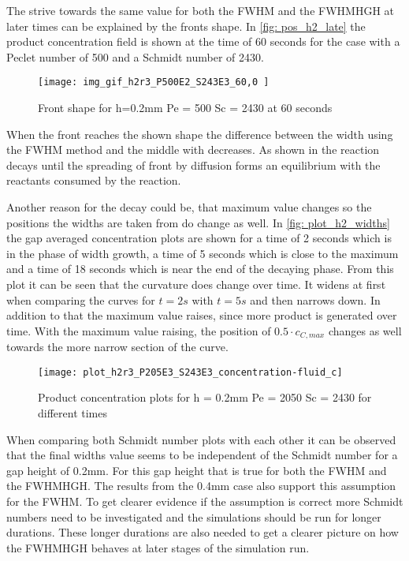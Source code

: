 \documentclass[../thesis.tex]{subfiles}
\begin{document}
The strive towards the same value for both the FWHM and the FWHMHGH at later times can be explained by the fronts shape. In \autoref{fig: pos_h2_late} the product concentration field is shown at the time of 60 seconds for the case with a Peclet number of 500 and a Schmidt number of 2430.
\begin{figure}[htb]
	\centering
	\texttt{[image: img\_gif\_h2r3\_P500E2\_S243E3\_60,0 ]}
	\caption{Front shape for h=0.2mm Pe = 500 Sc = 2430 at 60 seconds}
	\label{fig: pos_h2_late}
\end{figure}
When the front reaches the shown shape the difference between the width using the FWHM method and the middle with decreases. As shown in \cite{comolli2021dynamics} the reaction decays until the spreading of front by diffusion forms an equilibrium with the reactants consumed by the reaction.

Another reason for the decay could be, that maximum value changes so the positions the widths are taken from do change as well. In \autoref{fig: plot_h2_widths} the gap averaged concentration plots are shown for a time of 2 seconds which is in the phase of width growth, a time of 5 seconds which is close to the maximum and a time of 18 seconds which is near the end of the decaying phase. From this plot it can be seen that the curvature does change over time. It widens at first when comparing the curves for $t = 2s$ with $t = 5s$ and then narrows down. In addition to that the maximum value raises, since more product is generated over time. With the maximum value raising, the position of $0\text{.}5 \cdot c_{C,max}$ changes as well towards the more narrow section of the curve. 
\begin{figure}
	\centering
	\texttt{[image: plot\_h2r3\_P205E3\_S243E3\_concentration-fluid\_c]}
	\caption{Product concentration plots for h = 0.2mm  Pe = 2050 Sc = 2430 for different times}
	\label{fig: plot_h2_widths}
\end{figure}

When comparing both Schmidt number plots with each other it can be observed that the final widths value seems to be independent of the Schmidt number for a gap height of 0.2mm. For this gap height that is true for both the FWHM and the  FWHMHGH. The results from the 0.4mm case also support this assumption for the FWHM. To get clearer evidence if the assumption is correct more Schmidt numbers need to be investigated and the simulations should be run for longer durations. These longer durations are also needed to get a clearer picture on how the FWHMHGH behaves at later stages of the simulation run.
\end{document}
